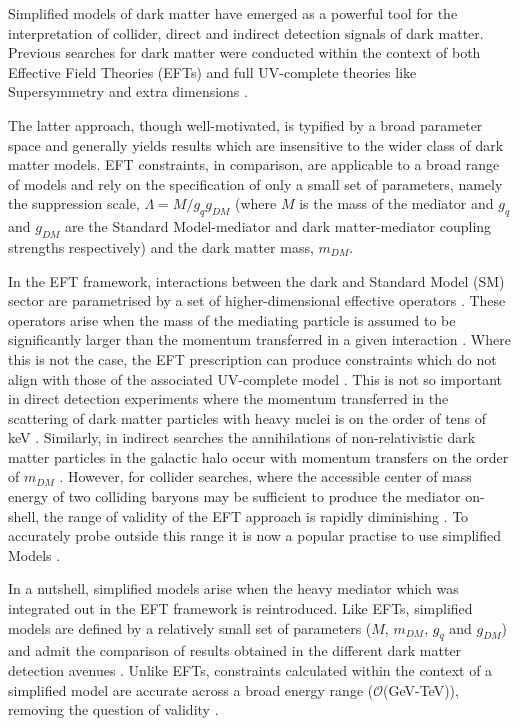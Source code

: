 \begin{flushleft}
Simplified models of dark matter have emerged as a powerful tool for the interpretation of collider, direct and indirect detection signals of dark matter. Previous searches for dark matter were conducted within the context of both Effective Field Theories (EFTs) \cite{Aad:1363019, ATLAS-CONF-2012-147, CMS-PAS-EXO-12-048, Buckley:2013jwa, Abdallah:1472683, MonoZ, MonoX} and full UV-complete theories like Supersymmetry \cite{ComppMSSM, Aad:2012ms, Aad:2012fqa, Aad:2014wea, SUSY_official_paper} and extra dimensions \cite{}.


The latter approach, though well-motivated, is typified by a broad parameter space and generally yields results which are insensitive to the wider class of dark matter models. EFT constraints, in comparison, are applicable to a broad range of models and rely on the specification of only a small set of parameters, namely the suppression scale, $\Lambda = M/g_{q}g_{DM}$ (where $M$ is the mass of the mediator and $g_{q}$ and $g_{DM}$ are the Standard Model-mediator and dark matter-mediator coupling strengths respectively) and the dark matter mass, $m_{DM}$.

\hspace{1cm} In the EFT framework, interactions between the dark and Standard Model (SM) sector are parametrised by a set of higher-dimensional effective operators \cite{}. These operators arise when the mass of the mediating particle is assumed to be significantly larger than the momentum transferred in a given interaction \cite{}. Where this is not the case, the EFT prescription can produce constraints which do not align with those of the associated UV-complete model \cite{}. This is not so important in direct detection experiments where the momentum transferred in the scattering of dark matter particles with heavy nuclei is on the order of tens of keV \cite{EFTDM, DMCons3}. Similarly, in indirect searches the annihilations of non-relativistic dark matter particles in the galactic halo occur with momentum transfers on the order of $m_{DM}$ \cite{}. However, for collider searches, where the accessible center of mass energy of two colliding baryons may be sufficient to produce the mediator on-shell, the range of validity of the EFT approach is rapidly diminishing \cite{}. To accurately probe outside this range it is now a popular practise to use simplified Models \cite{Buchmueller:2014yoa}.

\hspace{1cm} In a nutshell, simplified models arise when the heavy mediator which was integrated out in the EFT framework is reintroduced. Like EFTs, simplified models are defined by a relatively small set of parameters ($M$, $m_{DM}$, $g_{q}$ and $g_{DM}$) and admit the comparison of results obtained in the different dark matter detection avenues \cite{}. Unlike EFTs, constraints calculated within the context of a simplified model are accurate across a broad energy range ($\mathcal{O}$(GeV-TeV)), removing the question of validity \cite{}. 


\end{flushleft}
